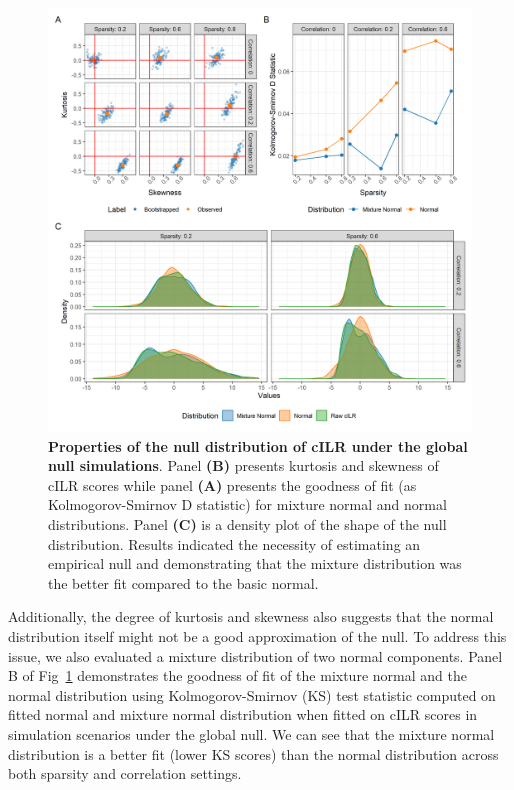 \documentclass[10pt,letterpaper]{article}
\begin{document}
\begin{figure} [!h]
    \centering
    \includegraphics[width=\linewidth]{figures/kurtosis_skewness_gof.png}
    \caption{{\bf Properties of the null distribution of cILR under the global null simulations}. Panel \textbf{(B)} presents kurtosis and skewness of cILR scores while panel \textbf{(A)} presents the goodness of fit (as Kolmogorov-Smirnov D statistic) for mixture normal and normal distributions. Panel \textbf{(C)} is a density plot of the shape of the null distribution. Results indicated the necessity of estimating an empirical null and demonstrating that the mixture distribution was the better fit compared to the basic normal.}
    \label{fig:1}
\end{figure}

Additionally, the degree of kurtosis and skewness also suggests that the normal distribution itself might not be a good approximation of the null. To address this issue, we also evaluated a mixture distribution of two normal components. Panel B of Fig~\ref{fig:1} demonstrates the goodness of fit of the mixture normal and the normal distribution using Kolmogorov-Smirnov (KS) test statistic computed on fitted normal and mixture normal distribution when fitted on cILR scores in simulation scenarios under the global null. We can see that the mixture normal distribution is a better fit (lower KS scores) than the normal distribution across both sparsity and correlation settings. 
\end{document}
